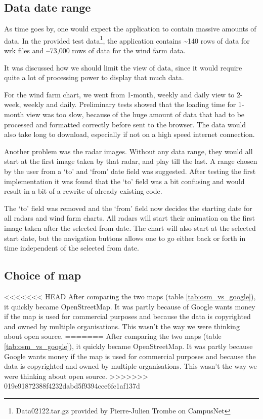 \subsection{Data date range}
As time goes by, one would expect the application to contain massive amounts of data.
In the provided test data\footnote{Data02122.tar.gz provided by Pierre-Julien Trombe on CampusNet}, the application contains \textasciitilde 140 rows of data for \textsf{wrk} files and \textasciitilde 73,000 rows of data for the wind farm data.

It was discussed how we should limit the view of data, since it would require quite a lot of processing power to display that much data.

For the wind farm chart, we went from 1-month, weekly and daily view to 2-week, weekly and daily.
Preliminary tests showed that the loading time for 1-month view was too slow, because of the huge amount of data that had to be processed and formatted correctly before sent to the browser. The data would also take long to download, especially if not on a high speed internet connection.

Another problem was the radar images. Without any data range, they would all start at the first image taken by that radar, and play till the last. A range chosen by the user from a `to' and `from' date field was suggested. After testing the first implementation it was found that the `to' field was a bit confusing and would result in a bit of a rewrite of already existing code.

The `to' field was removed and the `from' field now decides the starting date for all radars and wind farm charts.
All radars will start their animation on the first image taken after the selected from date.
The chart will also start at the selected start date, but the navigation buttons allows one to go either back or forth in time independent of the selected from date.

\subsection{Choice of map}
<<<<<<< HEAD
After comparing the two maps (table \ref{tab:osm_vs_google}), it quickly became OpenStreetMap. It was partly because of Google wants money if the map is used for commercial purposes and because the data is copyrighted and owned by multiple organisations. This wasn't the way we were thinking about open source.
=======
After comparing the two maps (table \ref{tab:osm_vs_google}), it quickly became OpenStreetMap. It was partly because Google wants money if the map is used for commercial purposes and because the data is copyrighted and owned by multiple organisations. This wasn't the way we were thinking about open source.
>>>>>>> 019e91872388f4232dabd5f9394cce6fc1af137d

